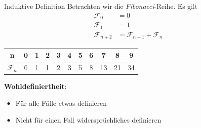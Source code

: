 \begin{frame}{Induktive Definition}
	Betrachten wir die \emph{Fibonacci}-Reihe.
	Es gilt 
	\begin{align*}
	\mathcal{F}_{0} &= 0 \\
	\mathcal{F}_1 &= 1 \\
	\mathcal{F}_{n+2} &= \mathcal{F}_{n+1} + \mathcal{F}_n 		
	\end{align*}
	\pause
	\begin{table}
	\centering
	\begin{tabular}{|c|c|c|c|c|c|c|c|c|c|c|}
		\hline
		n & 0 & 1 & 2 & 3 & 4 & 5 & 6 & 7 & 8 & 9 \\ \hline
		$\mathcal{F}_n$ & 0 & 1 & 1 & 2 & 3 & 5 & 8 & 13 & 21 & 34 \\ \hline
	\end{tabular}
	\end{table}
	
	\pause
	\textbf{Wohldefiniertheit}: 
	\begin{itemize}
	\item Für alle Fälle etwas definieren 
	\item Nicht für einen Fall widersprüchliches definieren
	\end{itemize}
\end{frame}


